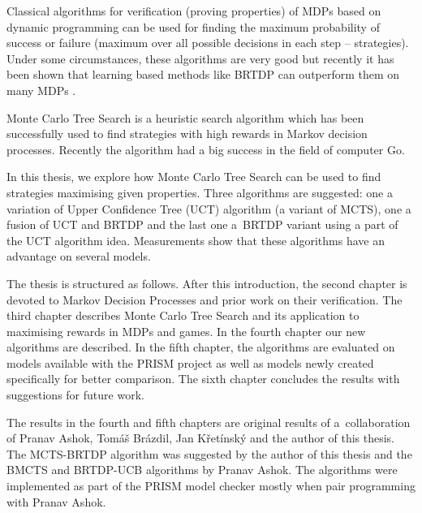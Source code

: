 Classical algorithms for verification (proving properties) of MDPs
based on dynamic programming can be used for finding the
maximum probability of success or failure (maximum over all possible decisions in
each step -- strategies). Under some circumstances, these algorithms are
very good but recently it has been shown that learning based methods
like BRTDP can outperform them on many MDPs \parencite{atva14}.

Monte Carlo Tree Search is a heuristic search algorithm which has been
successfully used to find strategies with high rewards in Markov decision
processes. Recently the algorithm had a big success in the field of
computer Go.

\pagebreak

In this thesis, we explore how Monte Carlo Tree Search can be used to
find strategies maximising given properties. Three algorithms are
suggested: one a variation of Upper Confidence Tree (UCT) algorithm (a variant
of MCTS), one a fusion of UCT and BRTDP and the last one a~BRTDP variant
using a part of the UCT algorithm idea.  Measurements show that these
algorithms have an advantage on several models.

The thesis is structured as follows. After this introduction, the second
chapter is devoted to Markov Decision Processes and prior work on their
verification.
The third chapter describes Monte Carlo Tree Search and its application
to maximising rewards in MDPs and games. In the fourth chapter our new
algorithms are described. In the fifth chapter,
the algorithms are evaluated on models available with the PRISM project
as well as models newly created specifically for better comparison.
The sixth chapter concludes the
results with suggestions for future work.

The results in the fourth and fifth chapters are original results of
a~collaboration of Pranav Ashok, Tomáš Brázdil, Jan Křetínský and the
author of this thesis. The MCTS-BRTDP algorithm was suggested by the
author of this thesis and the BMCTS and BRTDP-UCB algorithms by Pranav
Ashok. The algorithms were implemented as part of the PRISM model
checker mostly when pair programming with Pranav Ashok.
